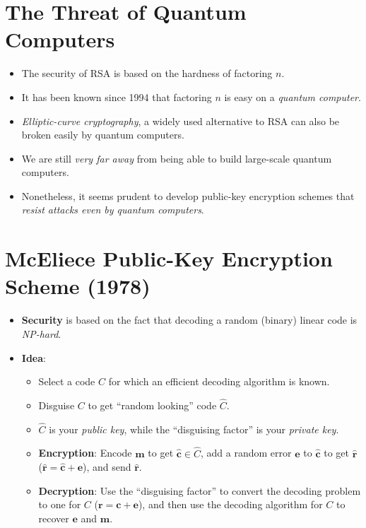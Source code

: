 \section{The Threat of Quantum Computers}
\begin{itemize}
      \item The security of RSA is based on the hardness of factoring $ n $.
      \item It has been known since 1994 that factoring $ n $ is easy
            on a \emph{quantum computer}.
      \item \emph{Elliptic-curve cryptography}, a widely used alternative to
            RSA can also be broken easily by quantum computers.
      \item We are still \emph{very far away} from being able to build
            large-scale quantum computers.
      \item Nonetheless, it seems prudent to develop public-key encryption
            schemes that \emph{resist attacks even by quantum computers}.
\end{itemize}
\section{McEliece Public-Key Encryption Scheme (1978)}
\begin{itemize}
      \item \textbf{Security} is based on the fact that decoding
            a random (binary) linear code is \emph{NP-hard}.
      \item \textbf{Idea}:
            \begin{itemize}
                  \item Select a code $ C $ for which an efficient decoding algorithm is known.
                  \item Disguise $ C $ to get ``random looking'' code $ \hat{C} $.
                  \item $ \hat{C} $ is your \emph{public key}, while the ``disguising factor''
                        is your \emph{private key}.
                  \item \textbf{Encryption}: Encode $ \symbf{m} $ to get
                        $ \hat{\symbf{c}}\in\hat{C} $, add a random error $ \symbf{e} $ to
                        $ \hat{\symbf{c}} $ to get $ \hat{\symbf{r}} $ ($ \hat{\symbf{r}}=\hat{\symbf{c}}+\symbf{\symbf{e}} $),
                        and send $ \hat{\symbf{r}} $.
                  \item \textbf{Decryption}: Use the ``disguising factor'' to
                        convert the decoding problem to one for $ C $ ($ \symbf{r}=\symbf{c}+\symbf{e} $), and
                        then use the decoding algorithm for $ C $ to recover $ \symbf{e} $ and $ \symbf{m} $.
            \end{itemize}
\end{itemize}
